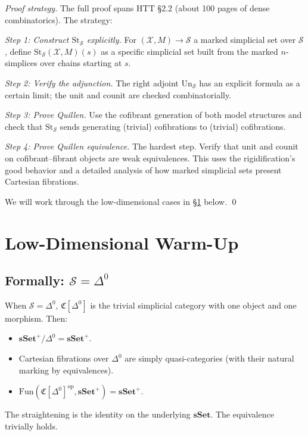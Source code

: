 \begin{proof}[Proof strategy]
The full proof spans HTT §2.2 (about 100 pages of dense combinatorics).
The strategy:

\emph{Step 1: Construct $\mathrm{St}_\mathcal{S}$ explicitly.} For
$(\mathcal{X}, M) \to \mathcal{S}$ a marked simplicial set over
$\mathcal{S}$, define $\mathrm{St}_\mathcal{S}(\mathcal{X}, M)(s)$ as a
specific simplicial set built from the marked $n$-simplices over chains
starting at $s$.

\emph{Step 2: Verify the adjunction.} The right adjoint $\mathrm{Un}_\mathcal{S}$
has an explicit formula as a certain limit; the unit and counit are
checked combinatorially.

\emph{Step 3: Prove Quillen.} Use the cofibrant generation of both model
structures and check that $\mathrm{St}_\mathcal{S}$ sends generating
(trivial) cofibrations to (trivial) cofibrations.

\emph{Step 4: Prove Quillen equivalence.} The hardest step. Verify that
unit and counit on cofibrant–fibrant objects are weak equivalences.
This uses the rigidification's good behavior and a detailed analysis of
how marked simplicial sets present Cartesian fibrations.

We will work through the low-dimensional cases in
\S\ref{sec:straightening-low-dim} below. \qed
\end{proof}


\section{Low-Dimensional Warm-Up}
\label{sec:straightening-low-dim}

\subsection{Formally: $\mathcal{S} = \Delta^0$}

\begin{example_thm}
\label{ex:straighten-point}
When $\mathcal{S} = \Delta^0$, $\mathfrak{C}[\Delta^0]$ is the trivial
simplicial category with one object and one morphism. Then:
\begin{itemize}
  \item $\mathbf{sSet}^+\!/\Delta^0 = \mathbf{sSet}^+$.
  \item Cartesian fibrations over $\Delta^0$ are simply quasi-categories
        (with their natural marking by equivalences).
  \item $\mathrm{Fun}(\mathfrak{C}[\Delta^0]^{\mathrm{op}}, \mathbf{sSet}^+) =
        \mathbf{sSet}^+$.
\end{itemize}
The straightening is the identity on the underlying $\mathbf{sSet}$.
The equivalence trivially holds.
\end{example_thm}

